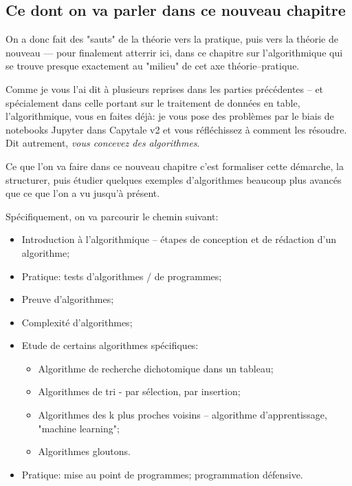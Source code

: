 \documentclass[12pt]{article}
\begin{document}
	\subsection{Ce dont on va parler dans ce nouveau chapitre}
	On a donc fait des "sauts" de la théorie vers la pratique, puis vers la théorie de nouveau --- pour finalement atterrir ici, dans ce chapitre sur l'algorithmique qui se trouve presque exactement au "milieu" de cet axe théorie--pratique.
	
	Comme je vous l'ai dit à plusieurs reprises dans les parties précédentes -- et spécialement dans celle portant sur le traitement de données en table, l'algorithmique, vous en faites déjà: je vous pose des problèmes par le biais de notebooks Jupyter dans Capytale v2 et vous réfléchissez à comment les résoudre. Dit autrement, \textit{vous concevez des algorithmes}.
	
	Ce que l'on va faire dans ce nouveau chapitre c'est formaliser cette démarche, la structurer, puis étudier quelques exemples d'algorithmes beaucoup plus avancés que ce que l'on a vu jusqu'à présent.
	
	Spécifiquement, on va parcourir le chemin suivant:
	\begin{itemize}
		\item Introduction à l'algorithmique -- étapes de conception et de rédaction d'un algorithme;
		\item Pratique: tests d'algorithmes / de programmes;
		\item Preuve d'algorithmes;
		\item Complexité d'algorithmes;
		\item Etude de certains algorithmes spécifiques:
		\begin{itemize}
			\item Algorithme de recherche dichotomique dans un tableau;
			\item Algorithmes de tri - par sélection, par insertion;
			\item Algorithmes des k plus proches voisins -- algorithme d'apprentissage, "machine learning";
			\item Algorithmes gloutons.
		\end{itemize}
		\item Pratique: mise au point de programmes; programmation défensive.
	\end{itemize}
	
\end{document}
